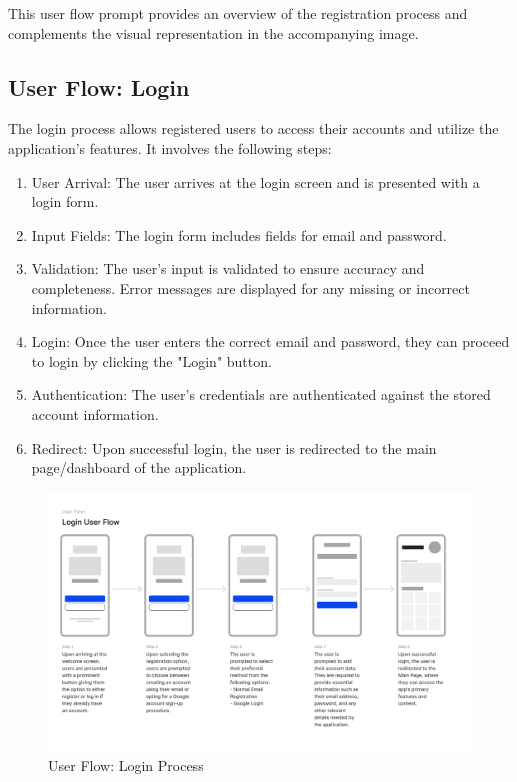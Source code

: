 This user flow prompt provides an overview of the registration process and complements the visual representation in the accompanying image.
\newpage
\subsection{User Flow: Login}

The login process allows registered users to access their accounts and utilize the application's features. It involves the following steps:

\begin{enumerate}
  \item User Arrival: The user arrives at the login screen and is presented with a login form.
  \item Input Fields: The login form includes fields for email and password.
  \item Validation: The user's input is validated to ensure accuracy and completeness. Error messages are displayed for any missing or incorrect information.
  \item Login: Once the user enters the correct email and password, they can proceed to login by clicking the "Login" button.
  \item Authentication: The user's credentials are authenticated against the stored account information.
  \item Redirect: Upon successful login, the user is redirected to the main page/dashboard of the application.
\end{enumerate}



\begin{figure}[ht]
  \centering
  \includegraphics[width=\textwidth]{Graphics/UserFlows/LoginUserFlow.png}
  \caption{User Flow: Login Process}
  \label{fig:login_flow}
\end{figure}

